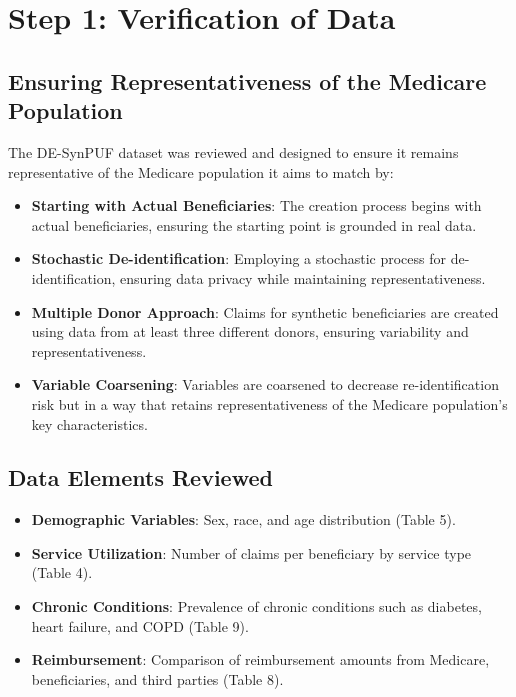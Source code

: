 \documentclass{article}
\begin{document}
\section*{Step 1: Verification of Data}

\subsection*{Ensuring Representativeness of the Medicare Population}

The DE-SynPUF dataset was reviewed and designed to ensure it remains representative of the Medicare population it aims to match by:

\begin{itemize}
    \item \textbf{Starting with Actual Beneficiaries}: The creation process begins with actual beneficiaries, ensuring the starting point is grounded in real data.
    \item \textbf{Stochastic De-identification}: Employing a stochastic process for de-identification, ensuring data privacy while maintaining representativeness.
    \item \textbf{Multiple Donor Approach}: Claims for synthetic beneficiaries are created using data from at least three different donors, ensuring variability and representativeness.
    \item \textbf{Variable Coarsening}: Variables are coarsened to decrease re-identification risk but in a way that retains representativeness of the Medicare population's key characteristics.
\end{itemize}

\subsection*{Data Elements Reviewed}

\begin{itemize}
    \item \textbf{Demographic Variables}: Sex, race, and age distribution (Table 5).
    \item \textbf{Service Utilization}: Number of claims per beneficiary by service type (Table 4).
    \item \textbf{Chronic Conditions}: Prevalence of chronic conditions such as diabetes, heart failure, and COPD (Table 9).
    \item \textbf{Reimbursement}: Comparison of reimbursement amounts from Medicare, beneficiaries, and third parties (Table 8).
\end{itemize}
\end{document}
